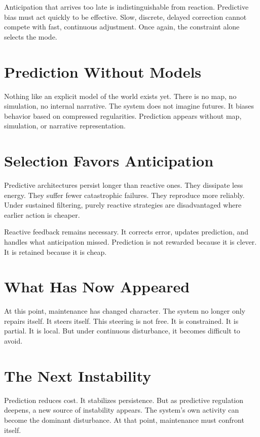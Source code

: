 \documentclass[11pt,twoside,openright]{book}
\begin{document}
Anticipation that arrives too late is indistinguishable from reaction. Predictive bias must act quickly to be effective. Slow, discrete, delayed correction cannot compete with fast, continuous adjustment. Once again, the constraint alone selects the mode.

\section*{Prediction Without Models}

Nothing like an explicit model of the world exists yet. There is no map, no simulation, no internal narrative. The system does not imagine futures. It biases behavior based on compressed regularities. Prediction appears without map, simulation, or narrative representation.

\section*{Selection Favors Anticipation}

Predictive architectures persist longer than reactive ones. They dissipate less energy. They suffer fewer catastrophic failures. They reproduce more reliably. Under sustained filtering, purely reactive strategies are disadvantaged where earlier action is cheaper.

Reactive feedback remains necessary. It corrects error, updates prediction, and handles what anticipation missed. Prediction is not rewarded because it is clever. It is retained because it is cheap.

\section*{What Has Now Appeared}

At this point, maintenance has changed character. The system no longer only repairs itself. It steers itself. This steering is not free. It is constrained. It is partial. It is local. But under continuous disturbance, it becomes difficult to avoid.

\section*{The Next Instability}

Prediction reduces cost. It stabilizes persistence. But as predictive regulation deepens, a new source of instability appears. The system's own activity can become the dominant disturbance. At that point, maintenance must confront itself.
\end{document}
